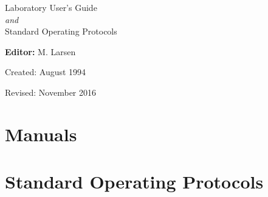 \documentclass{WSLsop}
\begin{document}
\hfill
\vspace{50mm}

\begin{center}
	\Huge{Laboratory User's Guide} \\ 
	\Large\normalfont\textit{and} \\ 
	\Huge{Standard Operating Protocols}
	
	\vspace{15mm}
	
	\normalsize\textbf{Editor:} M. Larsen
	
	\vspace{15mm}
	Created: August 1994
	
	Revised: November 2016
	
	\contact{} 
\end{center}		
		
\tableofcontents
\clearpage


\part{Manuals}




\part{Standard Operating Protocols}

\end{document}

